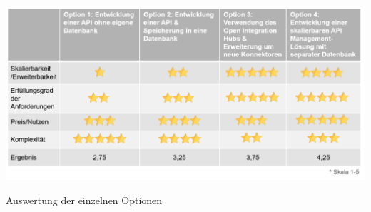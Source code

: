 \begin{table}[!h]
    \centering
    \includegraphics[width=15cm]{images/0x_implementation_possibilities/results.png}
    \caption{Auswertung der einzelnen Optionen}
    \label{fig:Auswertung der einzelnen Optionen}
\end{table}